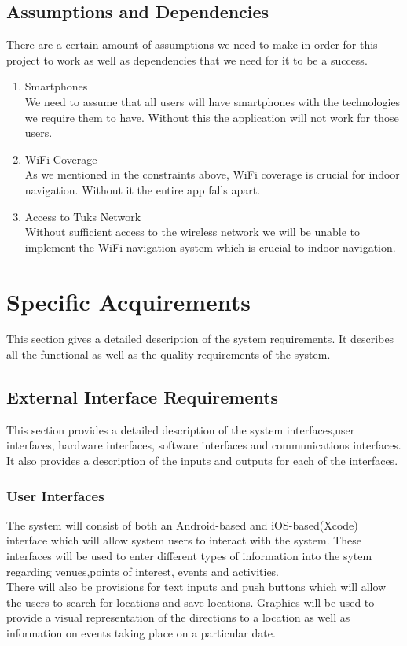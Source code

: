 \documentclass[a4paper,10pt]{article}
\begin{document}
	\subsection{Assumptions and Dependencies}
		There are a certain amount of assumptions we need to make in order for this project to work as well as dependencies that we need for it to be a success. 
		\begin{enumerate}
			\item Smartphones \\
			We need to assume that all users will have smartphones with the technologies we require them to have. Without this the application will not work for those users.
			
			\item WiFi Coverage \\
			As we mentioned in the constraints above, WiFi coverage is crucial for indoor navigation. Without it the entire app falls apart.
			
			\item Access to Tuks Network \\
			Without sufficient access to the wireless network we will be unable to implement the WiFi navigation system which is crucial to indoor navigation.
		\end{enumerate}
		
	\section{Specific Acquirements}
This section gives a detailed description of the system requirements. It describes all the functional as well as the quality requirements of the system.

	\subsection{External Interface Requirements}
This section provides a detailed description of the system interfaces,user interfaces, hardware interfaces, software interfaces and communications interfaces. It also provides a description of the inputs and outputs for each of the interfaces.
                 \subsubsection{User Interfaces}
The system will consist of both an Android-based and iOS-based(Xcode) interface which will allow system users to interact with the system. These interfaces will be used to enter different types of information into the sytem regarding venues,points of interest, events and activities.\\ There will also be provisions for text inputs and push buttons which will allow the users to search for locations and save locations. Graphics will be used to provide a visual representation of the directions to a location as well as information on events taking place on a particular date.
             
\end{document}
